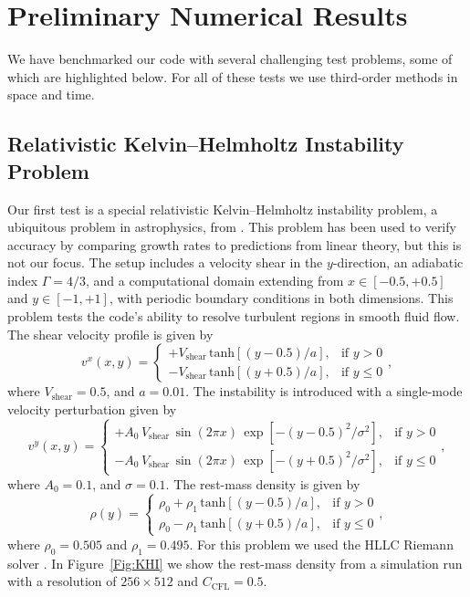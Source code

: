\documentclass[letterpaper]{jpconf}
\newcommand{\figref}[1]{Figure~\ref{#1}}
\begin{document}
\section{Preliminary Numerical Results}\label{sec.results}
We have benchmarked our code with several challenging test problems, some of which are highlighted below. For all of these tests we use third-order methods in space and time.

\subsection{Relativistic Kelvin--Helmholtz Instability Problem}
Our first test is a special relativistic Kelvin--Helmholtz instability problem, a ubiquitous problem in astrophysics, from \cite{RadiceRezzolla2012}. This problem has been used to verify accuracy by comparing growth rates to predictions from linear theory, but this is not our focus. The setup includes a velocity shear in the $y$-direction, an adiabatic index $\Gamma=4/3$, and a computational domain extending from $x\in\left[-0.5,+0.5\right]$ and $y\in\left[-1,+1\right]$, with periodic boundary conditions in both dimensions. This problem tests the code's ability to resolve turbulent regions in smooth fluid flow. The shear velocity profile is given by
\begin{equation}
v^{x}\left(x,y\right)=\begin{cases}+V_{\text{shear}}\,\text{tanh}\left[\left(y-0.5\right)/a\right],&\text{if }y>0\\-V_{\text{shear}}\,\text{tanh}\left[\left(y+0.5\right)/a\right],&\text{if }y\leq0\end{cases},
\end{equation}
where $V_{\text{shear}}=0.5$, and $a=0.01$.
The instability is introduced with a single-mode velocity perturbation given by
\begin{equation}
v^{y}\left(x,y\right)=\begin{cases}+A_{0}\,V_{\text{shear}}\,\sin\left(2\pi x\right)\,\exp\left[-\left(y-0.5\right)^{2}/\sigma^{2}\right],&\text{if }y>0\\-A_{0}\,V_{\text{shear}}\,\sin\left(2\pi x\right)\,\exp\left[-\left(y+0.5\right)^{2}/\sigma^{2}\right],&\text{if }y\leq0\end{cases},
\end{equation}
where $A_{0}=0.1$, and $\sigma=0.1$. The rest-mass density is given by
\begin{equation}
\rho\left(y\right)=\begin{cases}\rho_{0}+\rho_{1}\,\text{tanh}\left[\left(y-0.5\right)/a\right],&\text{if }y>0\\\rho_{0}-\rho_{1}\,\text{tanh}\left[\left(y+0.5\right)/a\right],&\text{if }y\leq0\end{cases},
\end{equation}
where $\rho_{0}=0.505$ and $\rho_{1}=0.495$. For this problem we used the HLLC Riemann solver \cite{MignoneBodo2005}. In \figref{Fig:KHI} we show the rest-mass density from a simulation run with a resolution of $256\times512$ and $C_{\text{CFL}}=0.5$.
\end{document}

